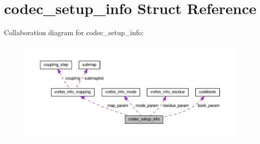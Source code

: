 \hypertarget{structcodec__setup__info}{}\section{codec\+\_\+setup\+\_\+info Struct Reference}
\label{structcodec__setup__info}


Collaboration diagram for codec\+\_\+setup\+\_\+info\+:
\nopagebreak
\begin{figure}[H]
\begin{center}
\leavevmode
\includegraphics[width=350pt]{structcodec__setup__info__coll__graph}
\end{center}
\end{figure}
